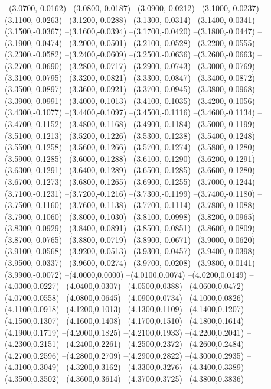 	--(3.0700,-0.0162)
	--(3.0800,-0.0187)
	--(3.0900,-0.0212)
	--(3.1000,-0.0237)
	--(3.1100,-0.0263)
	--(3.1200,-0.0288)
	--(3.1300,-0.0314)
	--(3.1400,-0.0341)
	--(3.1500,-0.0367)
	--(3.1600,-0.0394)
	--(3.1700,-0.0420)
	--(3.1800,-0.0447)
	--(3.1900,-0.0474)
	--(3.2000,-0.0501)
	--(3.2100,-0.0528)
	--(3.2200,-0.0555)
	--(3.2300,-0.0582)
	--(3.2400,-0.0609)
	--(3.2500,-0.0636)
	--(3.2600,-0.0663)
	--(3.2700,-0.0690)
	--(3.2800,-0.0717)
	--(3.2900,-0.0743)
	--(3.3000,-0.0769)
	--(3.3100,-0.0795)
	--(3.3200,-0.0821)
	--(3.3300,-0.0847)
	--(3.3400,-0.0872)
	--(3.3500,-0.0897)
	--(3.3600,-0.0921)
	--(3.3700,-0.0945)
	--(3.3800,-0.0968)
	--(3.3900,-0.0991)
	--(3.4000,-0.1013)
	--(3.4100,-0.1035)
	--(3.4200,-0.1056)
	--(3.4300,-0.1077)
	--(3.4400,-0.1097)
	--(3.4500,-0.1116)
	--(3.4600,-0.1134)
	--(3.4700,-0.1152)
	--(3.4800,-0.1168)
	--(3.4900,-0.1184)
	--(3.5000,-0.1199)
	--(3.5100,-0.1213)
	--(3.5200,-0.1226)
	--(3.5300,-0.1238)
	--(3.5400,-0.1248)
	--(3.5500,-0.1258)
	--(3.5600,-0.1266)
	--(3.5700,-0.1274)
	--(3.5800,-0.1280)
	--(3.5900,-0.1285)
	--(3.6000,-0.1288)
	--(3.6100,-0.1290)
	--(3.6200,-0.1291)
	--(3.6300,-0.1291)
	--(3.6400,-0.1289)
	--(3.6500,-0.1285)
	--(3.6600,-0.1280)
	--(3.6700,-0.1273)
	--(3.6800,-0.1265)
	--(3.6900,-0.1255)
	--(3.7000,-0.1244)
	--(3.7100,-0.1231)
	--(3.7200,-0.1216)
	--(3.7300,-0.1199)
	--(3.7400,-0.1180)
	--(3.7500,-0.1160)
	--(3.7600,-0.1138)
	--(3.7700,-0.1114)
	--(3.7800,-0.1088)
	--(3.7900,-0.1060)
	--(3.8000,-0.1030)
	--(3.8100,-0.0998)
	--(3.8200,-0.0965)
	--(3.8300,-0.0929)
	--(3.8400,-0.0891)
	--(3.8500,-0.0851)
	--(3.8600,-0.0809)
	--(3.8700,-0.0765)
	--(3.8800,-0.0719)
	--(3.8900,-0.0671)
	--(3.9000,-0.0620)
	--(3.9100,-0.0568)
	--(3.9200,-0.0513)
	--(3.9300,-0.0457)
	--(3.9400,-0.0398)
	--(3.9500,-0.0337)
	--(3.9600,-0.0274)
	--(3.9700,-0.0208)
	--(3.9800,-0.0141)
	--(3.9900,-0.0072)
	--(4.0000,0.0000)
	--(4.0100,0.0074)
	--(4.0200,0.0149)
	--(4.0300,0.0227)
	--(4.0400,0.0307)
	--(4.0500,0.0388)
	--(4.0600,0.0472)
	--(4.0700,0.0558)
	--(4.0800,0.0645)
	--(4.0900,0.0734)
	--(4.1000,0.0826)
	--(4.1100,0.0918)
	--(4.1200,0.1013)
	--(4.1300,0.1109)
	--(4.1400,0.1207)
	--(4.1500,0.1307)
	--(4.1600,0.1408)
	--(4.1700,0.1510)
	--(4.1800,0.1614)
	--(4.1900,0.1719)
	--(4.2000,0.1825)
	--(4.2100,0.1933)
	--(4.2200,0.2041)
	--(4.2300,0.2151)
	--(4.2400,0.2261)
	--(4.2500,0.2372)
	--(4.2600,0.2484)
	--(4.2700,0.2596)
	--(4.2800,0.2709)
	--(4.2900,0.2822)
	--(4.3000,0.2935)
	--(4.3100,0.3049)
	--(4.3200,0.3162)
	--(4.3300,0.3276)
	--(4.3400,0.3389)
	--(4.3500,0.3502)
	--(4.3600,0.3614)
	--(4.3700,0.3725)
	--(4.3800,0.3836)
